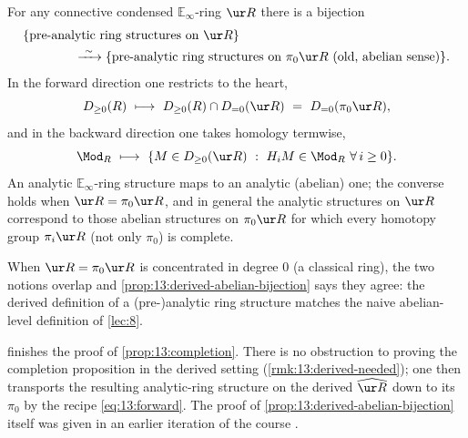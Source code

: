 \begin{proposition}
\label{prop:13:derived-abelian-bijection}
For any connective condensed $\mathbb{E}_\infty$-ring $\ur R$ there is a bijection
\begin{equation*}
\begin{aligned}
&\{\text{pre-analytic ring structures on }\ur R\}\\
&\hspace{4em}\xrightarrow{\ \sim\ }
\{\text{pre-analytic ring structures on }\pi_0\ur R\ (\text{old, abelian sense})\}.
\end{aligned}
\end{equation*}
In the forward direction one restricts to the heart,
\begin{equation}
\label{eq:13:forward}
D_{\ge 0}(R)\ \longmapsto\ D_{\ge 0}(R)\cap D_{=0}(\ur R)\ =\ D_{=0}(\pi_0\ur R),
\end{equation}
and in the backward direction one takes homology termwise,
\begin{equation}
\label{eq:13:backward}
\Mod_R\ \longmapsto\ \{M\in D_{\ge 0}(\ur R)\ :\ H_i M\in\Mod_R\ \forall\, i\ge 0\}.
\end{equation}
An analytic $\mathbb{E}_\infty$-ring structure maps to an analytic (abelian) one;
the converse holds when $\ur R=\pi_0\ur R$, and in general the analytic
structures on $\ur R$ correspond to those abelian structures on $\pi_0\ur R$ for
which every homotopy group $\pi_i\ur R$ (not only $\pi_0$) is complete.
\end{proposition}

\begin{remark}
\label{rmk:13:consistency}
When $\ur R=\pi_0\ur R$ is concentrated in degree $0$ (a classical ring), the two
notions overlap and \cref{prop:13:derived-abelian-bijection} says they agree: the
derived definition of a (pre-)analytic ring structure matches the naive
abelian-level definition of \cref{lec:8}.
\end{remark}

 finishes the proof of
\cref{prop:13:completion}. There is no obstruction to proving the completion
proposition in the derived setting (\cref{rmk:13:derived-needed}); one then
transports the resulting analytic-ring structure on the derived $\widehat{\ur R}$
down to its $\pi_0$ by the recipe \eqref{eq:13:forward}. The proof of
\cref{prop:13:derived-abelian-bijection} itself was given in an earlier iteration
of the course \cite{clausen2020analytic}.

